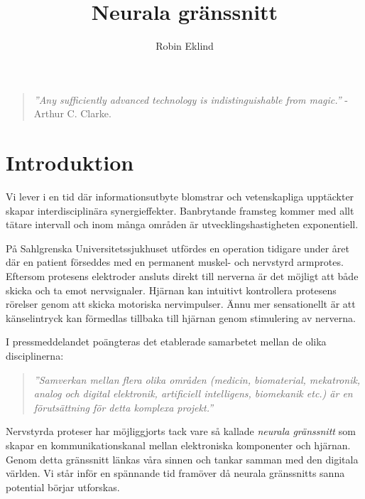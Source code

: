 \documentclass[12pt, a4paper]{article}
\title{Neurala gränssnitt}
\author{Robin Eklind}
\begin{document}
\maketitle

\vfill

\begin{quote}
	\textit{''Any sufficiently advanced technology is indistinguishable from
	magic.''} - \\ Arthur C. Clarke. \cite{clarke_quote}
\end{quote}

\pagebreak

\tableofcontents

\pagebreak


\section{Introduktion}

Vi lever i en tid där informationsutbyte blomstrar och vetenskapliga upptäckter
skapar interdisciplinära synergieffekter. Banbrytande framsteg kommer med allt
tätare intervall och inom många områden är utvecklingshastigheten exponentiell.
\cite{exponential}

På Sahlgrenska Universitetssjukhuset utfördes en operation tidigare under året
där en patient förseddes med en permanent muskel- och nervstyrd armprotes.
Eftersom protesens elektroder ansluts direkt till nerverna är det möjligt att
både skicka och ta emot nervsignaler. Hjärnan kan intuitivt kontrollera
protesens rörelser genom att skicka motoriska nervimpulser. Ännu mer
sensationellt är att känselintryck kan förmedlas tillbaka till hjärnan genom
stimulering av nerverna. \cite{prosthetic_operation}

I pressmeddelandet poängteras det etablerade samarbetet mellan de olika
disciplinerna:
\begin{quote}
	\textit{''Samverkan mellan flera olika områden (medicin, biomaterial,
	mekatronik, analog och digital elektronik, artificiell intelligens,
	biomekanik etc.) är en förutsättning för detta komplexa projekt.''}
	\cite{prosthetic_operation}
\end{quote}

Nervstyrda proteser har möjliggjorts tack vare så kallade \textit{neurala
gränssnitt} som skapar en kommunikationskanal mellan elektroniska komponenter
och hjärnan. Genom detta gränssnitt länkas våra sinnen och tankar samman med den
digitala världen. Vi står inför en spännande tid framöver då neurala gränssnitts
sanna potential börjar utforskas.
\end{document}
